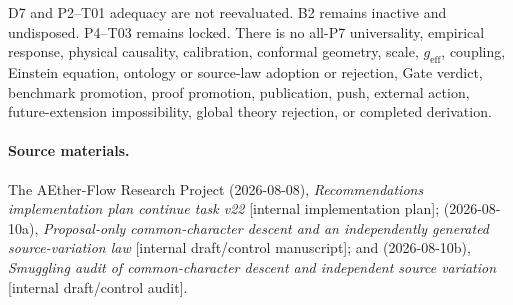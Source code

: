 \documentclass[11pt]{article}
\begin{document}
D7 and P2--T01 adequacy are not reevaluated.  B2 remains inactive and
undisposed.  P4--T03 remains locked.  There is no all-P7 universality,
empirical response, physical causality, calibration, conformal geometry,
scale, $g_{\mathrm{eff}}$, coupling, Einstein equation, ontology or source-law
adoption or rejection, Gate verdict, benchmark promotion, proof promotion,
publication, push, external action, future-extension impossibility, global
theory rejection, or completed derivation.

\paragraph{Source materials.}
\begingroup\footnotesize\raggedright
The AEther-Flow Research Project (2026-08-08), \emph{Recommendations
implementation plan continue task v22} [internal implementation plan];
(2026-08-10a), \emph{Proposal-only common-character descent and an
independently generated source-variation law} [internal draft/control
manuscript]; and (2026-08-10b), \emph{Smuggling audit of common-character
descent and independent source variation} [internal draft/control audit].
\endgroup
\end{document}
